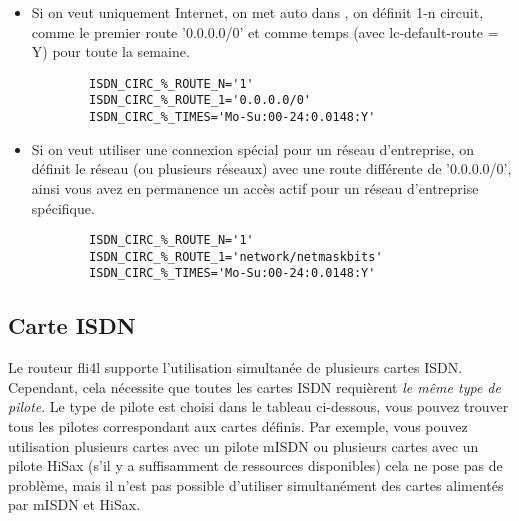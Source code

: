 \begin{itemize}
\item Si on veut uniquement Internet, on met auto dans ,
on définit 1-n circuit, comme le premier route '0.0.0.0/0' et comme temps
(avec lc-default-route = Y) pour toute la semaine.

\begin{small}
\begin{example}
\begin{verbatim}
        ISDN_CIRC_%_ROUTE_N='1'
        ISDN_CIRC_%_ROUTE_1='0.0.0.0/0'
        ISDN_CIRC_%_TIMES='Mo-Su:00-24:0.0148:Y'
\end{verbatim}
\end{example}
\end{small}

\item Si on veut utiliser une connexion spécial pour un réseau
d'entreprise, on définit le réseau (ou plusieurs réseaux)
avec une route différente de '0.0.0.0/0', ainsi vous avez en
permanence un accès actif pour un réseau d'entreprise spécifique.
\begin{small}
\begin{example}
\begin{verbatim}
        ISDN_CIRC_%_ROUTE_N='1'
        ISDN_CIRC_%_ROUTE_1='network/netmaskbits'
        ISDN_CIRC_%_TIMES='Mo-Su:00-24:0.0148:Y'
\end{verbatim}
\end{example}
\end{small}
\end{itemize}

\subsection{Carte ISDN}

Le routeur fli4l supporte l'utilisation simultanée de plusieurs cartes ISDN.
Cependant, cela nécessite que toutes les cartes ISDN requièrent \emph{le même
type de pilote}. Le type de pilote est choisi dans le tableau ci-dessous, vous pouvez
trouver tous les pilotes correspondant aux cartes définis. Par exemple, vous pouvez utilisation
plusieurs cartes avec un pilote mISDN ou plusieurs cartes avec un pilote HiSax
(s'il y a suffisamment de ressources disponibles) cela ne pose pas de problème, mais
il n'est pas possible d'utiliser simultanément des cartes alimentés par mISDN et HiSax.

